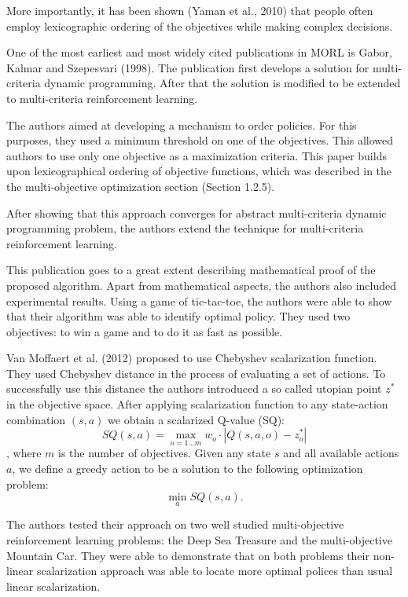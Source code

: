 More importantly, it has been shown (Yaman et al., 2010\nocite{Yaman20111290}) that people often employ lexicographic ordering of the objectives while making complex decisions.

One of the most earliest and most widely cited publications in MORL is Gabor, Kalmar and Szepesvari (1998)\nocite{gabor1998multi}. The publication first develops a solution for multi-criteria dynamic programming. After that the solution is modified to be extended to multi-criteria reinforcement learning.

The authors aimed at developing a mechanism to order policies. For this purposes, they used a minimum threshold on one of the objectives. This allowed authors to use only one objective as a maximization criteria. This paper builds upon lexicographical ordering of objective functions, which was described in the the multi-objective optimization section (Section 1.2.5).

After showing that this approach converges for abstract multi-criteria dynamic programming problem, the authors extend the technique for multi-criteria reinforcement learning.

This publication goes to a great extent describing mathematical proof of the proposed algorithm. Apart from mathematical aspects, the authors also included experimental results. Using a game of tic-tac-toe, the authors were able to show that their algorithm was able to identify optimal policy. They used two objectives: to win a game and to do it as fast as possible.

Van Moffaert et al. (2012)\nocite{van2012scalarized} proposed to use Chebyshev scalarization function. They used Chebyshev distance in the process of evaluating a set of actions. To successfully use this distance the authors introduced a so called utopian point $z^{*}$ in the objective space. After applying scalarization function to any state-action combination $(s,a)$ we obtain a scalarized Q-value (SQ):
$$ SQ(s,a) = \max_{o=1...m} w_{o} \cdot | Q(s,a,o) - z^{*}_{o} | $$
, where $m$ is the number of objectives. Given any state $s$ and all available actions $a$, we define a greedy action to be a solution to the following optimization problem:
$$ \min_{a} SQ(s,a). $$

The authors tested their approach on two well studied multi-objective reinforcement learning problems: the Deep Sea Treasure and the multi-objective Mountain Car. They were able to demonstrate that on both problems their non-linear scalarization approach was able to locate more optimal polices than usual linear scalarization.

